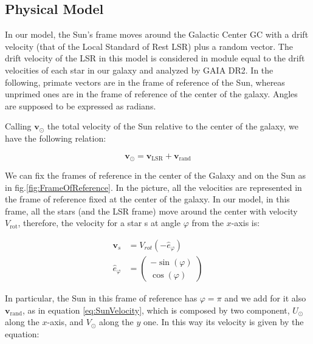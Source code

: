 \subsection{Physical Model}

In our model, the Sun's frame moves around the Galactic Center GC with a drift velocity (that of the Local Standard of Rest LSR) plus a random vector. The drift velocity of the LSR in this model is considered in module equal to the drift velocities of each star in our galaxy and analyzed by GAIA DR2.
In the following, primate vectors are in the frame of reference of the Sun, whereas unprimed ones are in the frame of reference of the center of the galaxy. Angles are supposed to be expressed as radians.

Calling $\bm{v}_{\odot}$ the total velocity of the Sun relative to the center of the galaxy, we have the following relation:

\begin{equation}\label{eq:SunVelocity}
    \bm{v}_{\odot} = \bm{v}_{\text{LSR}} + \bm{v}_{\text{rand}}
\end{equation}

\noindent
We can fix the frames of reference in the center of the Galaxy and on the Sun as in fig.\ref{fig:FrameOfReference}. In the picture, all the velocities are represented in the frame of reference fixed at the center of the galaxy. In our model, in this frame, all the stars (and the LSR frame) move around the center with velocity $V_{\text{rot}}$, therefore, the velocity for a star s at angle $\varphi$ from the $x$-axis is:

\begin{equation}\label{eq:VComponents}
    \begin{aligned}
        \bm{v}_s &= V_{rot} (-\hat{e}_{\varphi}) \\
        \hat{e}_{\varphi} &= \begin{pmatrix} -\sin(\varphi) \\ \cos(\varphi) \end{pmatrix}
    \end{aligned}
\end{equation}

\noindent
In particular, the Sun in this frame of reference has $\varphi = \pi$ and we add for it also $\bm{v}_{\text{rand}}$, as in equation \ref{eq:SunVelocity}, which is composed by two component, $U_{\odot}$ along the $x$-axis, and $V_{\odot}$ along the $y$ one. In this way its velocity is given by the equation:

